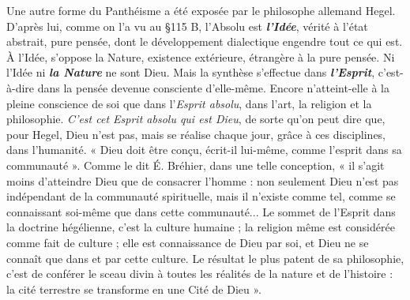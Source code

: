 Une autre forme du Panthéisme a été exposée par le philosophe
allemand Hegel. D’après lui, comme on l’a vu au \S 115 B,
l’Absolu est \textbf{\textit {l’Idée}}, vérité à l’état abstrait, pure pensée, dont le
développement dialectique engendre tout ce qui est. À l’Idée,
s'oppose la Nature, existence extérieure, étrangère à la pure pensée.
Ni l’Idée ni \textbf{\textit {la Nature}} ne sont Dieu. Mais la synthèse s’effectue
dans \textbf{\textit {l'Esprit}}, c’est-à-dire dans la pensée devenue consciente d’elle-même.
Encore n’atteint-elle à la pleine conscience de soi que dans
l'{\it Esprit absolu}, dans l'art, la religion et la philosophie. {\it C’est
cet Esprit absolu qui est Dieu}, de sorte qu’on peut dire que, pour
Hegel, Dieu n’est pas, mais se réalise chaque jour, grâce à ces
disciplines, dans l'humanité. « Dieu doit être conçu, écrit-il lui-même,
comme l'esprit dans sa communauté ». Comme le dit É. Bréhier,
dans une telle conception, « il s’agit moins d’atteindre Dieu que de
consacrer l’homme : non seulement Dieu n’est pas indépendant de
la communauté spirituelle, mais il n’existe comme tel, comme se
connaissant soi-même que dans cette communauté... Le sommet de
l'Esprit dans la doctrine hégélienne, c’est la culture humaine ; la
religion même est considérée comme fait de culture ; elle est connaissance
de Dieu par soi, et Dieu ne se connaît que dans et par cette
culture. Le résultat le plus patent de sa philosophie, c’est de conférer
le sceau divin à toutes les réalités de la nature et de l’histoire : la cité
terrestre se transforme en une Cité de Dieu ».

